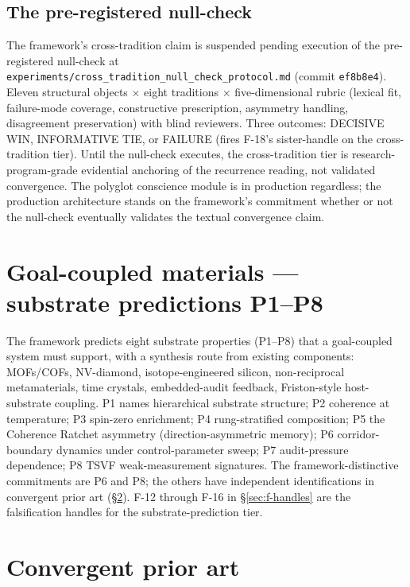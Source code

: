 \documentclass[11pt,a4paper]{article}
\begin{document}
\subsection*{The pre-registered null-check}

The framework's cross-tradition claim is suspended pending execution of the pre-registered null-check at \texttt{experiments/cross\_tradition\_null\_check\_protocol.md} (commit \texttt{ef8b8e4}). Eleven structural objects $\times$ eight traditions $\times$ five-dimensional rubric (lexical fit, failure-mode coverage, constructive prescription, asymmetry handling, disagreement preservation) with blind reviewers. Three outcomes: DECISIVE WIN, INFORMATIVE TIE, or FAILURE (fires F-18's sister-handle on the cross-tradition tier). Until the null-check executes, the cross-tradition tier is research-program-grade evidential anchoring of the recurrence reading, not validated convergence. The polyglot conscience module is in production regardless; the production architecture stands on the framework's commitment whether or not the null-check eventually validates the textual convergence claim.

\section{Goal-coupled materials --- substrate predictions P1--P8}\label{sec:substrate}

The framework predicts eight substrate properties (P1--P8) that a goal-coupled system must support, with a synthesis route from existing components: MOFs/COFs, NV-diamond, isotope-engineered silicon, non-reciprocal metamaterials, time crystals, embedded-audit feedback, Friston-style host-substrate coupling. P1 names hierarchical substrate structure; P2 coherence at temperature; P3 spin-zero enrichment; P4 rung-stratified composition; P5 the Coherence Ratchet asymmetry (direction-asymmetric memory); P6 corridor-boundary dynamics under control-parameter sweep; P7 audit-pressure dependence; P8 TSVF weak-measurement signatures. The framework-distinctive commitments are P6 and P8; the others have independent identifications in convergent prior art (\S\ref{sec:prior-art}). F-12 through F-16 in \S\ref{sec:f-handles} are the falsification handles for the substrate-prediction tier.

\section{Convergent prior art}\label{sec:prior-art}
\end{document}
